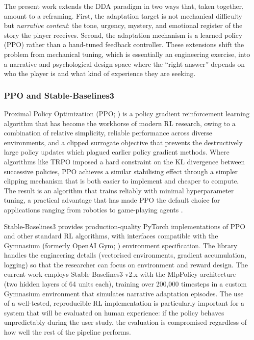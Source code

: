 The present work extends the DDA paradigm in two ways that, taken together, amount to a reframing. First, the adaptation target is not mechanical difficulty but \textit{narrative content}: the tone, urgency, mystery, and emotional register of the story the player receives. Second, the adaptation mechanism is a learned policy (PPO) rather than a hand-tuned feedback controller. These extensions shift the problem from mechanical tuning, which is essentially an engineering exercise, into a narrative and psychological design space where the ``right answer'' depends on who the player is and what kind of experience they are seeking.

\subsubsection{PPO and Stable-Baselines3}

Proximal Policy Optimization (PPO; \citealp{schulman2017proximal}) is a policy gradient reinforcement learning algorithm that has become the workhorse of modern RL research, owing to a combination of relative simplicity, reliable performance across diverse environments, and a clipped surrogate objective that prevents the destructively large policy updates which plagued earlier policy gradient methods. Where algorithms like TRPO imposed a hard constraint on the KL divergence between successive policies, PPO achieves a similar stabilising effect through a simpler clipping mechanism that is both easier to implement and cheaper to compute. The result is an algorithm that trains reliably with minimal hyperparameter tuning, a practical advantage that has made PPO the default choice for applications ranging from robotics to game-playing agents \citep{mnih2015human}.

Stable-Baselines3 \citep{raffin2021stable} provides production-quality PyTorch implementations of PPO and other standard RL algorithms, with interfaces compatible with the Gymnasium (formerly OpenAI Gym; \citealp{brockman2016openai}) environment specification. The library handles the engineering details (vectorised environments, gradient accumulation, logging) so that the researcher can focus on environment and reward design. The current work employs Stable-Baselines3 v2.x with the MlpPolicy architecture (two hidden layers of 64 units each), training over 200,000 timesteps in a custom Gymnasium environment that simulates narrative adaptation episodes. The use of a well-tested, reproducible RL implementation is particularly important for a system that will be evaluated on human experience: if the policy behaves unpredictably during the user study, the evaluation is compromised regardless of how well the rest of the pipeline performs.

